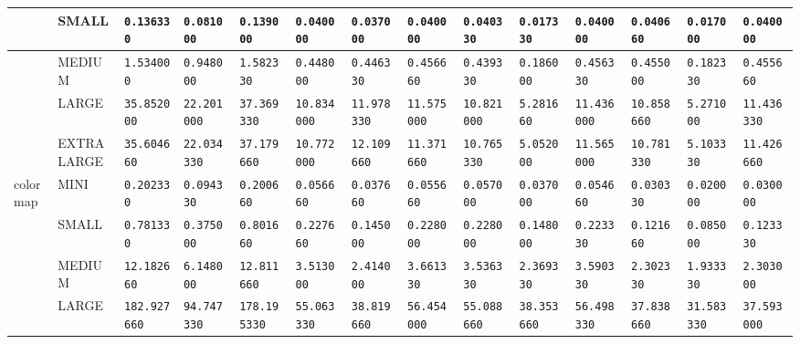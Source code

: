 \begin{tabular}{l | l | l | l | l | l | l | l | l | l | l | l | l | l}
             & SMALL      & \verb|0.136330     | & \verb|0.081000    | & \verb|0.139000    | & \verb|0.040000    | & \verb|0.037000    | & \verb|0.040000    | & \verb|0.040330    | & \verb|0.017330    | & \verb|0.040000    | & \verb|0.040660    | & \verb|0.017000    | & \verb|0.040000    | \\ \hline
             & MEDIUM     & \verb|1.534000     | & \verb|0.948000    | & \verb|1.582330    | & \verb|0.448000    | & \verb|0.446330    | & \verb|0.456660    | & \verb|0.439330    | & \verb|0.186000    | & \verb|0.456330    | & \verb|0.455000    | & \verb|0.182330    | & \verb|0.455660    | \\ \hline
             & LARGE      & \verb|35.852000    | & \verb|22.201000   | & \verb|37.369330   | & \verb|10.834000   | & \verb|11.978330   | & \verb|11.575000   | & \verb|10.821000   | & \verb|5.281660    | & \verb|11.436000   | & \verb|10.858660   | & \verb|5.271000    | & \verb|11.436330   | \\ \hline
             & EXTRALARGE & \verb|35.604660    | & \verb|22.034330   | & \verb|37.179660   | & \verb|10.772000   | & \verb|12.109660   | & \verb|11.371660   | & \verb|10.765330   | & \verb|5.052000    | & \verb|11.565000   | & \verb|10.781330   | & \verb|5.103330    | & \verb|11.426660   | \\ \hline
    colormap & MINI       & \verb|0.202330     | & \verb|0.094330    | & \verb|0.200660    | & \verb|0.056660    | & \verb|0.037660    | & \verb|0.055660    | & \verb|0.057000    | & \verb|0.037000    | & \verb|0.054660    | & \verb|0.030330    | & \verb|0.020000    | & \verb|0.030000    | \\ \hline
             & SMALL      & \verb|0.781330     | & \verb|0.375000    | & \verb|0.801660    | & \verb|0.227660    | & \verb|0.145000    | & \verb|0.228000    | & \verb|0.228000    | & \verb|0.148000    | & \verb|0.223330    | & \verb|0.121660    | & \verb|0.085000    | & \verb|0.123330    | \\ \hline
             & MEDIUM     & \verb|12.182660    | & \verb|6.148000    | & \verb|12.811660   | & \verb|3.513000    | & \verb|2.414000    | & \verb|3.661330    | & \verb|3.536330    | & \verb|2.369330    | & \verb|3.590330    | & \verb|2.302330    | & \verb|1.933330    | & \verb|2.303000    | \\ \hline
             & LARGE      & \verb|182.927660   | & \verb|94.747330   | & \verb|178.195330  | & \verb|55.063330   | & \verb|38.819660   | & \verb|56.454000   | & \verb|55.088660   | & \verb|38.353660   | & \verb|56.498330   | & \verb|37.838660   | & \verb|31.583330   | & \verb|37.593000   | \\ \hline

\end{tabular}
